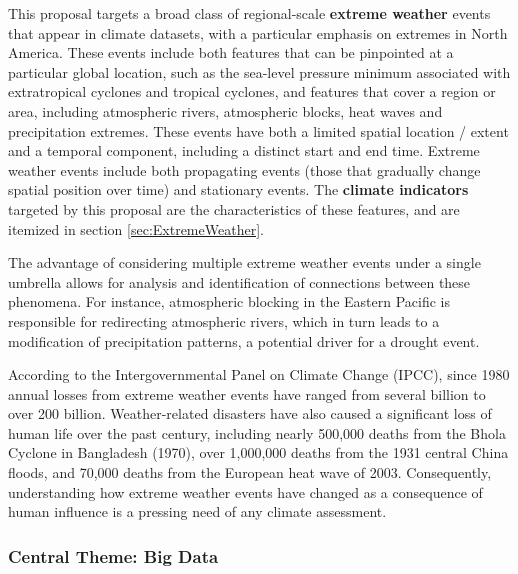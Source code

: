 \documentclass[11pt]{article}
\begin{document}
This proposal targets a broad class of regional-scale \textbf{extreme weather} events that appear in climate datasets, with a particular emphasis on extremes in North America.  These events include both features that can be pinpointed at a particular global location, such as the sea-level pressure minimum associated with extratropical cyclones and tropical cyclones, and features that cover a region or area, including atmospheric rivers, atmospheric blocks, heat waves and precipitation extremes.  These events have both a limited spatial location / extent and a temporal component, including a distinct start and end time.  Extreme weather events include both propagating events (those that gradually change spatial position over time) and stationary events.  The \textbf{climate indicators} targeted by this proposal are the characteristics of these features, and are itemized in section \ref{sec:ExtremeWeather}.

The advantage of considering multiple extreme weather events under a single umbrella allows for analysis and identification of connections between these phenomena.  For instance, atmospheric blocking in the Eastern Pacific is responsible for redirecting atmospheric rivers, which in turn leads to a modification of precipitation patterns, a potential driver for a drought event.

According to the Intergovernmental Panel on Climate Change (IPCC), since 1980 annual losses from extreme weather events have ranged from several billion to over 200 billion.  Weather-related disasters have also caused a significant loss of human life over the past century, including nearly 500,000 deaths from the Bhola Cyclone in Bangladesh (1970), over 1,000,000 deaths from the 1931 central China floods, and 70,000 deaths from the European heat wave of 2003.  Consequently, understanding how extreme weather events have changed as a consequence of human influence is a pressing need of any climate assessment.

\subsubsection{Central Theme: Big Data}
\end{document}
